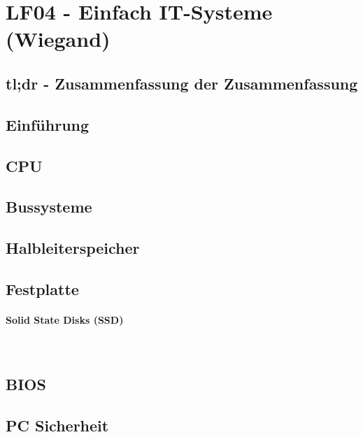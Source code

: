 \section{LF04 - Einfach IT-Systeme (Wiegand)}
%

\subsection{tl;dr - Zusammenfassung der Zusammenfassung}

\subsection{Einführung}

\subsection{CPU}

\subsection{Bussysteme}

\subsection{Halbleiterspeicher}

\subsection{Festplatte}

\paragraph{Solid State Disks (SSD)}~\\

\subsection{BIOS}

\subsection{PC Sicherheit}

